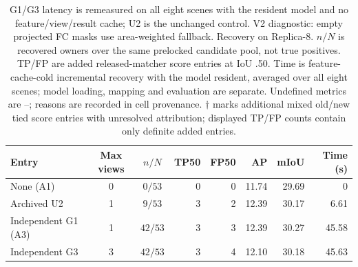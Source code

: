 \begin{table}[!ht]
\centering
\caption{G1/G3 latency is remeasured on all eight scenes with the resident model and no feature/view/result cache; U2 is the unchanged control. V2 diagnostic: empty projected FC masks use area-weighted fallback. Recovery on Replica-8. $n/N$ is recovered owners over the same prelocked candidate pool, not true positives. TP/FP are added released-matcher score entries at IoU .50. Time is feature-cache-cold incremental recovery with the model resident, averaged over all eight scenes; model loading, mapping and evaluation are separate. Undefined metrics are --; reasons are recorded in cell provenance. $\dagger$ marks additional mixed old/new tied score entries with unresolved attribution; displayed TP/FP counts contain only definite added entries.}
\label{tab:recovery}
\fontsize{9}{10.5}\selectfont
\setlength{\tabcolsep}{4pt}
\begin{tabular*}{\textwidth}{@{\extracolsep{\fill}}lccrrrrr@{}}
\toprule
Entry & Max views & $n/N$ & TP50 & FP50 & AP & mIoU & Time (s) \\
\midrule
None (A1) & 0 & $0/53$ & 0 & 0 & 11.74 & 29.69 & 0 \\
Archived U2 & 1 & $9/53$ & 3 & 2 & 12.39 & 30.17 & 6.61 \\
Independent G1 (A3) & 1 & $42/53$ & 3 & 3 & 12.39 & 30.27 & 45.58 \\
Independent G3 & 3 & $42/53$ & 3 & 4 & 12.10 & 30.18 & 45.63 \\
\bottomrule
\end{tabular*}
\end{table}
